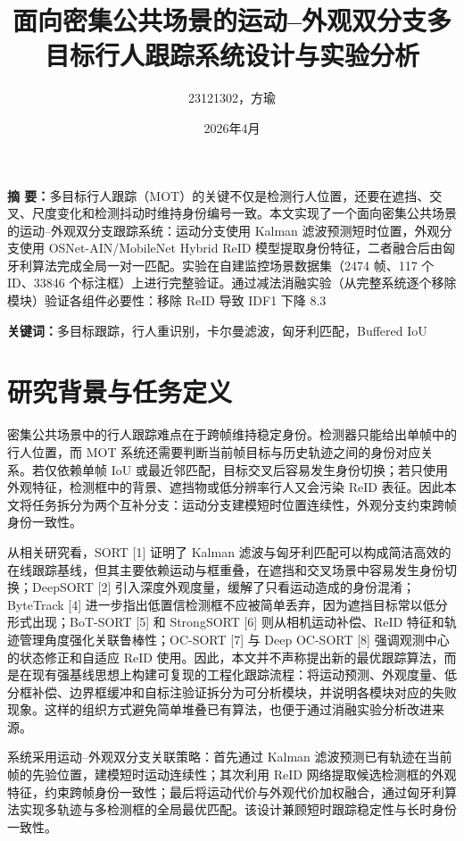 \documentclass[UTF8,a4paper,10pt]{ctexart}
\title{\vspace{-0.7em}\textbf{面向密集公共场景的运动--外观双分支多目标行人跟踪系统设计与实验分析}\vspace{-0.4em}}
\author{23121302，方瑜}
\date{2026年4月\vspace{-0.8em}}
\begin{document}
\maketitle
\vspace{-1.3em}

\noindent\textbf{摘 要：}多目标行人跟踪（MOT）的关键不仅是检测行人位置，还要在遮挡、交叉、尺度变化和检测抖动时维持身份编号一致。本文实现了一个面向密集公共场景的运动--外观双分支跟踪系统：运动分支使用 Kalman 滤波预测短时位置，外观分支使用 OSNet-AIN/MobileNet Hybrid ReID 模型提取身份特征，二者融合后由匈牙利算法完成全局一对一匹配。实验在自建监控场景数据集（2474 帧、117 个 ID、33846 个标注框）上进行完整验证。通过减法消融实验（从完整系统逐个移除模块）验证各组件必要性：移除 ReID 导致 IDF1 下降 8.3%

\noindent\textbf{关键词：}多目标跟踪，行人重识别，卡尔曼滤波，匈牙利匹配，Buffered IoU

\section{研究背景与任务定义}
密集公共场景中的行人跟踪难点在于跨帧维持稳定身份。检测器只能给出单帧中的行人位置，而 MOT 系统还需要判断当前帧目标与历史轨迹之间的身份对应关系。若仅依赖单帧 IoU 或最近邻匹配，目标交叉后容易发生身份切换；若只使用外观特征，检测框中的背景、遮挡物或低分辨率行人又会污染 ReID 表征。因此本文将任务拆分为两个互补分支：运动分支建模短时位置连续性，外观分支约束跨帧身份一致性。

从相关研究看，SORT [1] 证明了 Kalman 滤波与匈牙利匹配可以构成简洁高效的在线跟踪基线，但其主要依赖运动与框重叠，在遮挡和交叉场景中容易发生身份切换；DeepSORT [2] 引入深度外观度量，缓解了只看运动造成的身份混淆；ByteTrack [4] 进一步指出低置信检测框不应被简单丢弃，因为遮挡目标常以低分形式出现；BoT-SORT [5] 和 StrongSORT [6] 则从相机运动补偿、ReID 特征和轨迹管理角度强化关联鲁棒性；OC-SORT [7] 与 Deep OC-SORT [8] 强调观测中心的状态修正和自适应 ReID 使用。因此，本文并不声称提出新的最优跟踪算法，而是在现有强基线思想上构建可复现的工程化跟踪流程：将运动预测、外观度量、低分框补偿、边界框缓冲和自标注验证拆分为可分析模块，并说明各模块对应的失败现象。这样的组织方式避免简单堆叠已有算法，也便于通过消融实验分析改进来源。

系统采用运动--外观双分支关联策略：首先通过 Kalman 滤波预测已有轨迹在当前帧的先验位置，建模短时运动连续性；其次利用 ReID 网络提取候选检测框的外观特征，约束跨帧身份一致性；最后将运动代价与外观代价加权融合，通过匈牙利算法实现多轨迹与多检测框的全局最优匹配。该设计兼顾短时跟踪稳定性与长时身份一致性。
\end{document}
